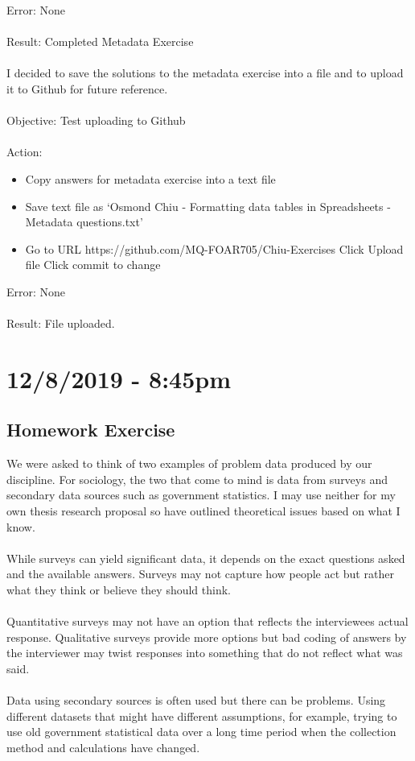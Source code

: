 \documentclass{article}
\begin{document}
Error: None\\\\
Result: Completed Metadata Exercise\\\\
I decided to save the solutions to the metadata exercise into a file and to upload it to Github for future reference.\\\\
Objective: Test uploading to Github\\\\
Action:\\
\begin{itemize}
\item Copy answers for metadata exercise into a text file
\item Save text file as ‘Osmond Chiu - Formatting data tables in Spreadsheets - Metadata questions.txt’
\item Go to URL https://github.com/MQ-FOAR705/Chiu-Exercises
Click Upload file
Click commit to change
\end{itemize}
Error: None\\\\
Result: File uploaded.
\section*{12/8/2019 - 8:45pm}
\subsection*{Homework Exercise}
We were asked to think of two examples of problem data produced by our discipline. For sociology, the two that come to mind is data from surveys and secondary data sources such as government statistics. I may use neither for my own thesis research proposal so have outlined theoretical issues based on what I know.\\\\
While surveys can yield significant data, it depends on the exact questions asked and the available answers. Surveys may not capture how people act but rather what they think or believe they should think.\\\\
Quantitative surveys may not have an option that reflects the interviewees actual response. Qualitative surveys provide more options but bad coding of answers by the interviewer may twist responses into something that do not reflect what was said.\\\\
Data using secondary sources is often used but there can be problems. Using different datasets that might have different assumptions, for example, trying to use old government statistical data over a long time period when the collection method and calculations have changed.
\end{document}
